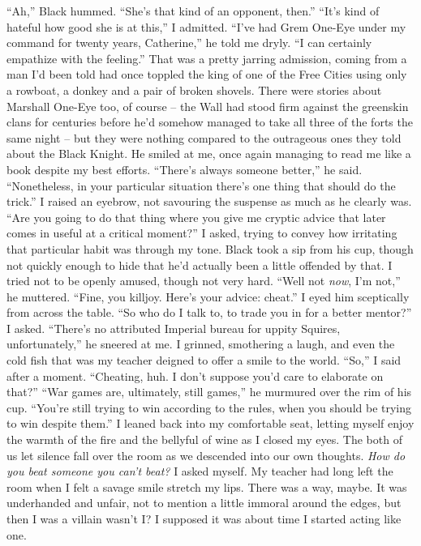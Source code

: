 \documentclass[12pt, openany]{book}
\begin{document}
“Ah,” Black hummed. “She’s that kind of an opponent, then.”
“It’s kind of hateful how good she is at this,” I admitted.
“I’ve had Grem One-Eye under my command for twenty years, Catherine,” he told me dryly. “I can certainly empathize with the feeling.”
That was a pretty jarring admission, coming from a man I’d been told had once toppled the king of one of the Free Cities using only a rowboat, a donkey and a pair of broken shovels. There were stories about Marshall One-Eye too, of course – the Wall had stood firm against the greenskin clans for centuries before he’d somehow managed to take all three of the forts the same night – but they were nothing compared to the outrageous ones they told about the Black Knight. He smiled at me, once again managing to read me like a book despite my best efforts.
“There’s always someone better,” he said. “Nonetheless, in your particular situation there’s one thing that should do the trick.”
I raised an eyebrow, not savouring the suspense as much as he clearly was.
“Are you going to do that thing where you give me cryptic advice that later comes in useful at a critical moment?” I asked, trying to convey how irritating that particular habit was through my tone.
Black took a sip from his cup, though not quickly enough to hide that he’d actually been a little offended by that. I tried not to be openly amused, though not very hard.
“Well not \textit{now}, I’m not,” he muttered. “Fine, you killjoy. Here’s your advice: cheat.”
I eyed him sceptically from across the table.
“So who do I talk to, to trade you in for a better mentor?” I asked.
“There’s no attributed Imperial bureau for uppity Squires, unfortunately,” he sneered at me.
I grinned, smothering a laugh, and even the cold fish that was my teacher deigned to offer a smile to the world.
“So,” I said after a moment. “Cheating, huh. I don’t suppose you’d care to elaborate on that?”
“War games are, ultimately, still games,” he murmured over the rim of his cup. “You’re still trying to win according to the rules, when you should be trying to win despite them.”
I leaned back into my comfortable seat, letting myself enjoy the warmth of the fire and the bellyful of wine as I closed my eyes. The both of us let silence fall over the room as we descended into our own thoughts. \textit{How do you beat someone you can’t beat? }I asked myself\textit{. }My teacher had long left the room when I felt a savage smile stretch my lips. There was a way, maybe. It was underhanded and unfair, not to mention a little immoral around the edges, but then I was a villain wasn’t I?
I supposed it was about time I started acting like one.
\clearpage
\end{document}
